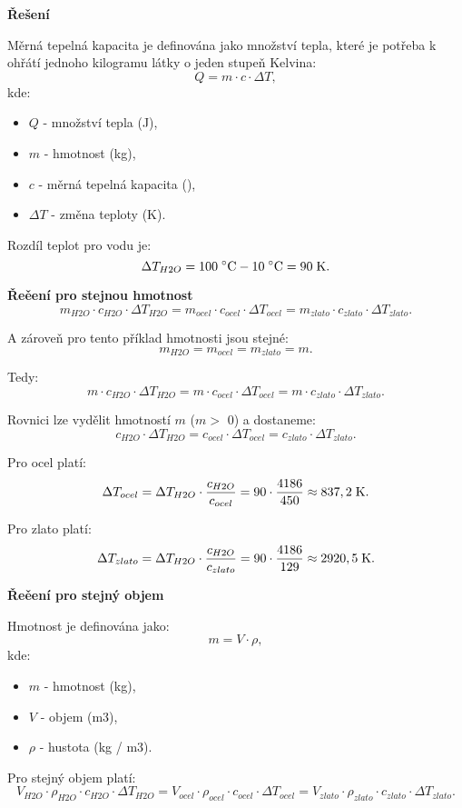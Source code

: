 \documentclass{article}
\begin{document}
\textbf{Řešení}

Měrná tepelná kapacita je definována jako množství tepla, které je potřeba k ohřátí jednoho kilogramu látky o jeden stupeň Kelvina:
\begin{equation}
    Q = m \cdot c \cdot \Delta T,
\end{equation}
kde:
\begin{itemize}
    \item $Q$ - množství tepla (J),
    \item $m$ - hmotnost (kg),
    \item $c$ - měrná tepelná kapacita (\ueqJperKGperK),
    \item $\Delta T$ - změna teploty (K).
\end{itemize}

Rozdíl teplot pro vodu je:
$$
    \Delta T_{H2O} = 100 \; ^\circ \textrm{C} - 10 \; ^\circ \textrm{C} = 90 \; \textrm{K}.
$$

\textbf{Řeěení pro stejnou hmotnost}
$$
    m_{H2O} \cdot c_{H2O} \cdot \Delta T_{H2O} = m_{ocel} \cdot c_{ocel} \cdot \Delta T_{ocel} = m_{zlato} \cdot c_{zlato} \cdot \Delta T_{zlato}.
$$

A zároveň pro tento příklad hmotnosti jsou stejné:
$$
    m_{H2O} = m_{ocel} = m_{zlato} = m.
$$

Tedy:
$$
    m \cdot c_{H2O} \cdot \Delta T_{H2O} = m \cdot c_{ocel} \cdot \Delta T_{ocel} = m \cdot c_{zlato} \cdot \Delta T_{zlato}.
$$

Rovnici lze vydělit hmotností $m$ ($m >$ 0) a dostaneme:
$$
    c_{H2O} \cdot \Delta T_{H2O} = c_{ocel} \cdot \Delta T_{ocel} = c_{zlato} \cdot \Delta T_{zlato}.
$$

Pro ocel platí:
$$
    \Delta T_{ocel} = \Delta T_{H2O} \cdot \frac{c_{H2O}}{c_{ocel}} = 90 \cdot \frac{4 186}{450} \approx 837,2 \; \textrm{K}.
$$

Pro zlato platí:
$$
    \Delta T_{zlato} = \Delta T_{H2O} \cdot \frac{c_{H2O}}{c_{zlato}} = 90 \cdot \frac{4 186}{129} \approx 2 920,5 \; \textrm{K}.
$$

\textbf{Řeěení pro stejný objem}

Hmotnost je definována jako:
$$
    m = V \cdot \rho,
$$
kde:
\begin{itemize}
    \item $m$ - hmotnost (kg),
    \item $V$ - objem (m3),
    \item $\rho$ - hustota (kg / m3).
\end{itemize}

Pro stejný objem platí:
$$
    V_{H2O} \cdot \rho_{H2O} \cdot c_{H2O} \cdot \Delta T_{H2O} = V_{ocel} \cdot \rho_{ocel} \cdot c_{ocel} \cdot \Delta T_{ocel} = V_{zlato} \cdot \rho_{zlato} \cdot c_{zlato} \cdot \Delta T_{zlato}.
$$
\end{document}
